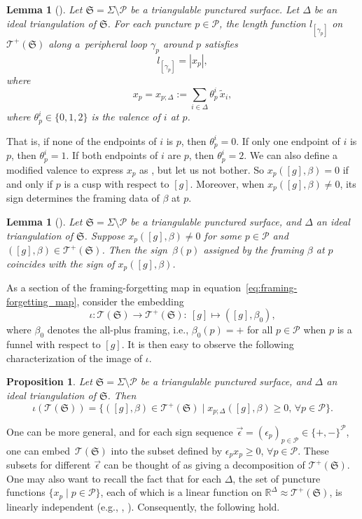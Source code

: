 \documentclass[10pt,a4paper]{amsart}
\numberwithin{equation}{section}
\newtheorem{Lemma}[Theorem]{Lemma}
\newtheorem{Proposition}[Theorem]{Proposition}
\theoremstyle{definition}
\newcommand{\til}[1]{\widetilde{#1}}
\begin{document}
\begin{Lemma}[\cite{CF, FG07}]
\label{lem:puncture_function_as_sum}
Let $\mathfrak{S} = \Sigma \setminus \mathcal{P}$ be a triangulable punctured surface. Let $\Delta$ be an ideal triangulation of $\mathfrak{S}$. For each puncture $p \in \mathcal{P}$, the length function $l_{[\gamma_p]}$ on $\mathscr{T}^+(\mathfrak{S})$ along a~peripheral loop $\gamma_p$ around $p$ satisfies
\[
l_{[\gamma_p]} = \left| x_p \right|,
\]
where
\[
x_p = x_{p;\Delta} := \sum_{i \in \Delta} \theta^i_p \, \til{x}_i,
\]
where $\theta_p^i \in \{0,1,2\}$ is the valence of $i$ at $p$.
\end{Lemma}
That is, if none of the endpoints of $i$ is $p$, then $\theta_p^i=0$. If only one endpoint of $i$ is $p$, then $\theta_p^i=1$. If both endpoints of $i$ are $p$, then $\theta_p^i=2$. We can also define a modified valence \smash{$\til{\theta}^i_p$} to express $x_p$ as \smash{$\sum_{i\in \Delta} \til{\theta}^i_p \, x_i$}, but let us not bother. So $x_p([g],\beta) =0$ if and only if $p$ is a cusp with respect to $[g]$. Moreover, when $x_p([g],\beta) \neq 0$, its sign determines the framing data of $\beta$ at $p$.
\begin{Lemma}[\cite{CF,FG07}]
Let $\mathfrak{S} = \Sigma \setminus \mathcal{P}$ be a triangulable punctured surface, and $\Delta$ an ideal triangulation of $\mathfrak{S}$. Suppose $x_p([g],\beta) \neq 0$ for some $p\in \mathcal{P}$ and $([g],\beta) \in \mathscr{T}^+(\mathfrak{S})$. Then the sign~$\beta(p)$ assigned by the framing $\beta$ at $p$ coincides with the sign of $x_p([g],\beta)$.
\end{Lemma}
As a section of the framing-forgetting map in equation~\eqref{eq:framing-forgetting_map}, consider the embedding
\[
\iota \colon \mathscr{T}(\mathfrak{S}) \to \mathscr{T}^+(\mathfrak{S}) \colon \ [g] \mapsto ([g], \beta_0),
\]
where $\beta_0$ denotes the all-plus framing, i.e., $\beta_0(p)=+$ for all $p \in \mathcal{P}$ when $p$ is a funnel with respect to $[g]$. It is then easy to observe the following characterization of the image of $\iota$.
\begin{Proposition}
Let $\mathfrak{S} = \Sigma \setminus \mathcal{P}$ be a triangulable punctured surface, and $\Delta$ an ideal triangulation of $\mathfrak{S}$. Then
\[
\iota(\mathscr{T}(\mathfrak{S})) = \{ ([g],\beta) \in \mathscr{T}^+(\mathfrak{S}) \mid x_{p;\Delta}([g],\beta) \ge 0, \, \forall p \in \mathcal{P} \}.
\]
\end{Proposition}
One can be more general, and for each sign sequence $\vec{\epsilon} = (\epsilon_p)_{p \in \mathcal{P}} \in \{+,-\}^\mathcal{P}$, one can embed~$\mathscr{T}(\mathfrak{S})$ into the subset defined by $\epsilon_p x_p \ge 0$, $\forall p \in \mathcal{P}$. These subsets for different $\vec{\epsilon}$ can be thought of as giving a decomposition of $\mathscr{T}^+(\mathfrak{S})$. One may also want to recall the fact that for each $\Delta$, the set of puncture functions $\{ x_p \mid p \in \mathcal{P} \}$, each of which is a linear function on $\mathbb{R}^\Delta \approx \mathscr{T}^+(\mathfrak{S})$, is linearly independent (e.g., \cite[Lemma~8]{BL07}, \cite[Lemma~3.2]{Kim_irreducible}). Consequently, the following hold.
\end{document}
